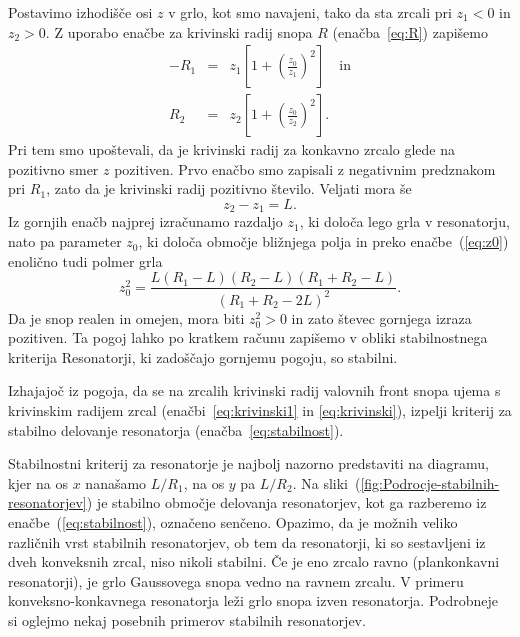 Postavimo izhodišče osi $z$ v grlo, kot smo
navajeni, tako da sta zrcali pri $z_{1}<0$ in $z_{2}>0$. Z uporabo enačbe
za krivinski radij snopa $R$ (enačba~\ref{eq:R}) zapišemo 
\begin{eqnarray}
-R_{1} & = & z_{1}\left[1+\left(\frac{z_{0}}{z_{1}}\right)^{2}\right] \quad  \label{eq:krivinski1} \textrm{in}\\
R_{2} & = & z_{2}\left[1+\left(\frac{z_{0}}{z_{2}}\right)^{2}\right].
\label{eq:krivinski}
\end{eqnarray}
Pri tem smo upoštevali, da je krivinski radij za konkavno zrcalo glede na 
pozitivno smer $z$ pozitiven. Prvo enačbo smo zapisali z negativnim 
predznakom pri $R_1$, zato da je krivinski radij pozitivno število.
Veljati mora še 
\begin{equation}
z_{2}-z_{1}=L.
\label{eq:razlikaz}
\end{equation}
Iz gornjih enačb najprej izračunamo razdaljo $z_{1}$, ki določa
lego grla v resonatorju, nato pa parameter $z_{0}$, ki določa
območje bližnjega polja in preko enačbe~(\ref{eq:z0}) enolično tudi polmer grla
\begin{equation}
z_{0}^{2}=\frac{L(R_{1}-L)(R_{2}-L)(R_{1}+R_{2}-L)}{(R_{1}+R_{2}-2L)^{2}}.
\label{eq:z0_stab}
\end{equation}
Da je snop realen in omejen, mora biti $z_{0}^{2}>0$ in zato števec
gornjega izraza pozitiven. Ta pogoj lahko po kratkem računu zapišemo
v obliki stabilnostnega kriterija
Resonatorji, ki zadoščajo gornjemu pogoju, so stabilni. 

\begin{definition}
Izhajajoč iz pogoja, da se na zrcalih krivinski radij valovnih front snopa ujema s krivinskim
radijem zrcal (enačbi~\ref{eq:krivinski1} in \ref{eq:krivinski}), izpelji 
kriterij za stabilno delovanje resonatorja 
(enačba~\ref{eq:stabilnost}).
\end{definition}

Stabilnostni kriterij za resonatorje je najbolj nazorno predstaviti na diagramu, 
kjer na os $x$ nanašamo $L/R_{1}$, na os $y$ pa $L/R_{2}$. Na 
sliki~(\ref{fig:Podrocje-stabilnih-resonatorjev}) je stabilno območje delovanja 
resonatorjev, kot ga razberemo iz enačbe~(\ref{eq:stabilnost}), označeno senčeno.
Opazimo, da je možnih veliko različnih vrst stabilnih resonatorjev, ob tem da 
resonatorji, ki so sestavljeni iz dveh konveksnih zrcal, niso nikoli stabilni.
Če je eno zrcalo ravno (plankonkavni resonatorji), je grlo Gaussovega snopa vedno 
na ravnem zrcalu. V primeru konveksno-konkavnega resonatorja leži grlo snopa
izven resonatorja. Podrobneje si oglejmo nekaj posebnih primerov stabilnih resonatorjev. 

